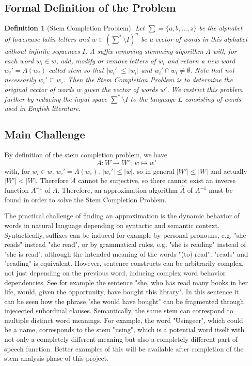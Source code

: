 \documentclass[11pt]{article}
\newtheorem{definition}{Definition}
\begin{document}
\subsection{Formal Definition of the Problem}

\begin{definition}[Stem Completion Problem]
    Let $\sum = \{a,b,...,z\}$ be the alphabet of lowercase latin letters and $w\in(\sum^*\setminus{I})^n$ be a vector of words in this alphabet without infinite sequences $I$. A suffix-removing stemming algorithm $A$ will, for each word $w_i\in w$, add, modify or remove letters of $w_i$ and return a new word $w_i'=A(w_i)$ called stem so that $\vert w_i' \vert\leq \vert w_i \vert$ and $w_i'\cap w_i \neq \emptyset$. Note that not necessarily $w_i'\subseteq w_i$. Then the Stem Completion Problem is to determine the original vector of words $w$ given the vector of words $w'$. We restrict this problem further by reducing the input space $\sum^*\setminus{I}$ to the language $L$ consisting of words used in English literature.
\end{definition}

\subsection{Main Challenge}

By definition of the stem completion problem, we have 
$$A : W \rightarrow W'\mbox{; } w \mapsto w' $$
with, for $w_i\in w$, $w_i' = A(w_i)$, $\vert w_i' \vert\leq \vert w \vert$,
so in general $\vert W' \vert\leq \vert W \vert$ and actually $\vert W' \vert < \vert W \vert$. Therefore $A$ cannot be surjective, so there cannot exist an inverse function $A^{-1}$ of $A$. Therefore, an approximation algorithm $\hat{A}$ of $A^{-1}$ must be found in order to solve the Stem Completion Problem.

The practical challenge of finding an approximation is the dynamic behavior of words in natural language depending on syntactic and semantic context. Syntactically, suffixes can be induced for example by personal pronouns, e.g. "she reads" instead "she read", or by grammatical rules, e.g. "she is reading" instead of "she is read", although the intended meaning of the words "(to) read", "reads" and "reading" is equivalent. However, sentence constructs can be arbitrarily complex, not just depending on the previous word, inducing complex word behavior dependencies. See for example the sentence "she, who has read many books in her life, would, given the opportunity, have bought this library". In this sentence it can be seen how the phrase "she would have bought" can be fragmented through injecected subordinal clauses. Semantically, the same stem can correspond to multiple distinct word meanings. For example, the word "Usingeer", which could be a name, corresponds to the stem "using", which is a potential word itself with not only a completely different meaning but also a completely different part of speech function. Better examples of this will be available after completion of the stem analysis phase of this project.
\end{document}

